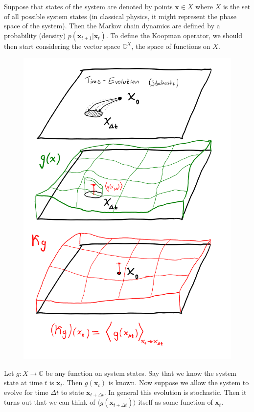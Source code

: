 \documentclass[]{article}
\newcommand{\w}[1]{\mathbf{#1}}
\newcommand{\CC}{\mathbb{C}}
\begin{document}
Suppose that states of the system are denoted by points $\w{x}\in X$ where $X$ is the set of all possible system states (in classical physics, it might represent the phase space of the system). Then the Markov chain dynamics are defined by a probability (density) $p(\w{x}_{t+1}|\w{x}_{t})$. To define the Koopman operator, we should then start considering the vector space $\CC^X$, the space of functions on $X$.

\begin{figure}[h!]
	\includegraphics[width=\textwidth]{koopman_definition_diagram.png}
\end{figure}

Let $g:X\to\CC$ be any function on system states. Say that we know the system state at time $t$ is $\w{x}_t$. Then $g(\w{x}_t)$ is known. Now suppose we allow the system to evolve for time $\Delta t$ to state $\w{x}_{t+\Delta t}$. In general this evolution is stochastic. Then it turns out that we can think of $\langle g(\w{x}_{t+\Delta t})\rangle$ itself as some function of $\w{x}_t$.
\end{document}
